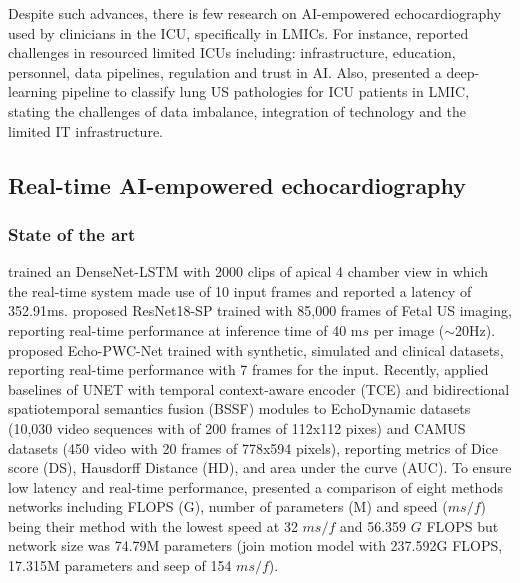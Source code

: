 \documentclass[mlabstract,twocolumn]{jmlr}
\begin{document}
Despite such advances, there is few research on AI-empowered echocardiography used by clinicians in the ICU, specifically in LMICs.
For instance, \cite{2021-huyNhat-vanHao-in-FAIR-MICCAI} reported challenges in resourced limited ICUs including: infrastructure, education, personnel, data pipelines, regulation and trust in AI.
Also, \cite{2021-kerdegari-Applied-Sciences-MDPI, 2021-kerdegari-ISBI-IEEE, 2021-huyNhat-kerdegari-in-FAIR-MICCAI} presented a deep-learning pipeline to classify lung US pathologies for ICU patients in LMIC, stating the challenges of data imbalance, integration of technology and the limited IT infrastructure.

\subsection{Real-time AI-empowered echocardiography}
\subsubsection{State of the art}  \label{subsec:State_of_the_art}
\citet{woudenberg2018} trained an DenseNet-LSTM with 2000 clips of apical 4 chamber view in which the real-time system made use of 10 input frames and reported a latency of 352.91ms.
\citet{toussaint2018-MICCAI} proposed ResNet18-SP trained with 85,000 frames of Fetal US imaging, reporting real-time performance at inference time of 40 m$s$ per image ($\sim$20Hz).
\citet{ostvik2021-TMI} proposed Echo-PWC-Net trained with synthetic, simulated and clinical datasets, reporting real-time performance with 7 frames for the input.
Recently, \citet{wu2022} applied baselines of UNET with temporal context-aware encoder (TCE) and bidirectional spatiotemporal semantics fusion (BSSF) modules to EchoDynamic datasets (10,030 video sequences with of 200 frames of 112x112 pixes) and CAMUS datasets (450 video with 20 frames of 778x594 pixels), reporting metrics of Dice score (DS), Hausdorff Distance (HD), and area under the curve (AUC).
To ensure low latency and real-time performance, \citet{wu2022} presented a comparison of eight methods networks including FLOPS (G), number of parameters (M) and speed ($ms/f$) being their method with the lowest speed at 32 $ms/f$ and 56.359 $G$ FLOPS but network size was 74.79M parameters (join motion model with 237.592G FLOPS, 17.315M parameters and seep of 154 $ms/f$).
\end{document}
